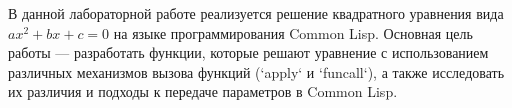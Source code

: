 
В данной лабораторной работе реализуется решение квадратного уравнения вида \(ax^2 + bx + c = 0\) на языке программирования Common Lisp. Основная цель работы — разработать функции, которые решают уравнение с использованием различных механизмов вызова функций (`apply` и `funcall`), а также исследовать их различия и подходы к передаче параметров в Common Lisp.


\clearpage
